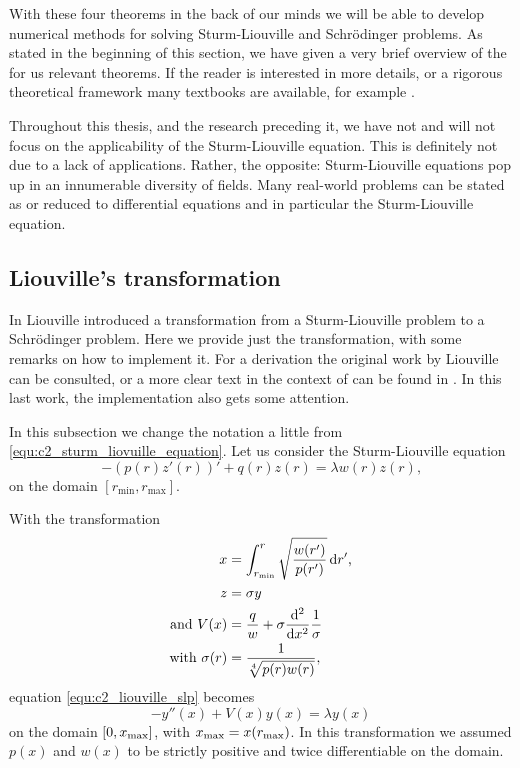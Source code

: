 With these four theorems in the back of our minds we will be able to develop numerical methods for solving Sturm-Liouville and Schrödinger problems. As stated in the beginning of this section, we have given a very brief overview of the for us relevant theorems. If the reader is interested in more details, or a rigorous theoretical framework many textbooks are available, for example \cite{sagan_boundary_1961,al-gwaiz_sturmliouville_2008,zettl_sturmliouville_2012,guenther_sturmliouville_2018}.

Throughout this thesis, and the research preceding it, we have not and will not focus on the applicability of the Sturm-Liouville equation. This is definitely not due to a lack of applications. Rather, the opposite: Sturm-Liouville equations pop up in an innumerable diversity of fields. Many real-world problems can be stated as or reduced to differential equations and in particular the Sturm-Liouville equation.


\subsection{Liouville's transformation}\label{sec:c2_liouville_transformation}

In \cite{liouville_second_1837} Liouville introduced a transformation from a Sturm-Liouville problem to a Schrödinger problem. Here we provide just the transformation, with some remarks on how to implement it. For a derivation the original work by Liouville \cite{liouville_second_1837} can be consulted, or a more clear text in the context of \matslise{} can be found in \cite{ledoux_study_2007}. In this last work, the implementation also gets some attention.

In this subsection we change the notation a little from \eqref{equ:c2_sturm_liovuille_equation}. Let us consider the Sturm-Liouville equation
\begin{equation}\label{equ:c2_liouville_slp}
    -(p(r) z'(r))' + q(r) z(r) = \lambda w(r) z(r)\text{,}
\end{equation}
on the domain $[r_\text{min}, r_\text{max}]$. 

With the transformation
\begin{align*}
x &= \int_{r_\text{min}}^{r} \sqrt{\frac{w(r')}{p(r')}}\,\dd r'\text{,} \\
z &= \sigma y \\
\text{and } V(x) &= \frac{q}{w} + \sigma {\dv[2]{}{x}} \frac{1}{\sigma} \\
\text{with } \sigma(r) &= \frac{1}{\sqrt[4]{p(r)w(r)}},
\end{align*}
equation \eqref{equ:c2_liouville_slp} becomes
$$
-y''(x) + V(x) y(x) = \lambda y(x)
$$
on the domain $[0, {x_{\text{max}}}]$, with ${x_{\text{max}}} = x(r_\text{max})$. In this transformation we assumed $p(x)$ and $w(x)$ to be strictly positive and twice differentiable on the domain.

